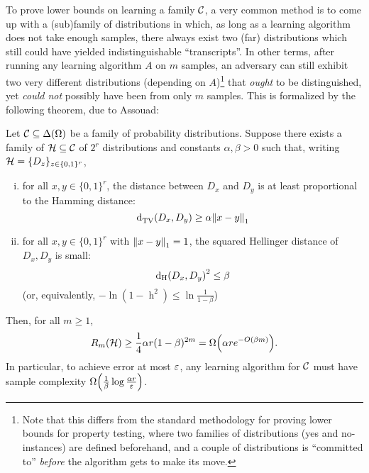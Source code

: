\documentclass[11pt]{article}
\begin{document}
To prove lower bounds on learning a family $\mathcal{C}$, a very common method is to come up with a (sub)family of distributions in which, as long as a learning algorithm does not take enough samples, there always exist two (far) distributions which still could have yielded indistinguishable ``transcripts''. In other terms, after running any learning algorithm $A$ on $m$ samples, an adversary can still exhibit two very different distributions (depending on $A$)\footnote{Note that this differs from the standard methodology for proving lower bounds for property testing, where two families of distributions (\textsf{yes} and \textsf{no}-instances) are defined beforehand, and a couple of distributions is ``committed to'' \emph{before} the algorithm gets to make its move.} that \emph{ought} to be distinguished, yet \emph{could not} possibly have been from only $m$ samples. This is formalized by the following theorem, due to Assouad:
\begin{theorem}
Let $\mathcal{C}\subseteq\Delta\!\left(\Omega\right)$ be a family of probability distributions. Suppose there exists a family of $\mathcal{H}\subseteq\mathcal{C}$ of $2^r$ distributions and constants $\alpha,\beta > 0$ such that, writing $\mathcal{H}=\{D_z\}_{z\in\{0,1\}^r}$,
\begin{enumerate}[(i)]
  \item\label{item:assouad:condition:1} for all $x,y\in\{0,1\}^r$, the distance between $D_x$ and $D_y$ is at least proportional to the Hamming distance:
    \begin{equation}\label{eq:assouad:condition:1}
      {\operatorname{d}_{\rm TV}^{}\!\left({\ensuremath{D}_x, \ensuremath{D}_y}\right)} \geq \alpha {\lVert x-y{\rVert}}_1
    \end{equation}
  \item\label{item:assouad:condition:2} for all $x,y\in\{0,1\}^r$ with  ${\lVert x-y{\rVert}}_1=1$, the squared Hellinger distance of $D_x,D_y$ is small:
    \begin{equation}\label{eq:assouad:condition:2}
      {\operatorname{d_{\rm{}H}}\!\left({\ensuremath{D}_x, \ensuremath{D}_y}\right)}^2 \leq \beta
    \end{equation}
    (or, equivalently, $-\ln(1-\operatorname{h}^2) \leq \ln\frac{1}{1-\beta}$)
\end{enumerate}
Then, for all $m \geq 1$,
    \begin{equation}\label{eq:assouad:conclusion}
        R_m(\mathcal{H}) \geq \frac{1}{4}\alpha r (1-\beta)^{2m} = \bigOmega{\alpha r e^{-\bigO{\beta m}} }.
    \end{equation}
In particular, to achieve error at most $\varepsilon$, any learning algorithm for $\mathcal{C}$ must have sample complexity $\bigOmega{\frac{1}{\beta}\log\frac{\alpha r}{\eps}}$.
\end{theorem}
\end{document}
